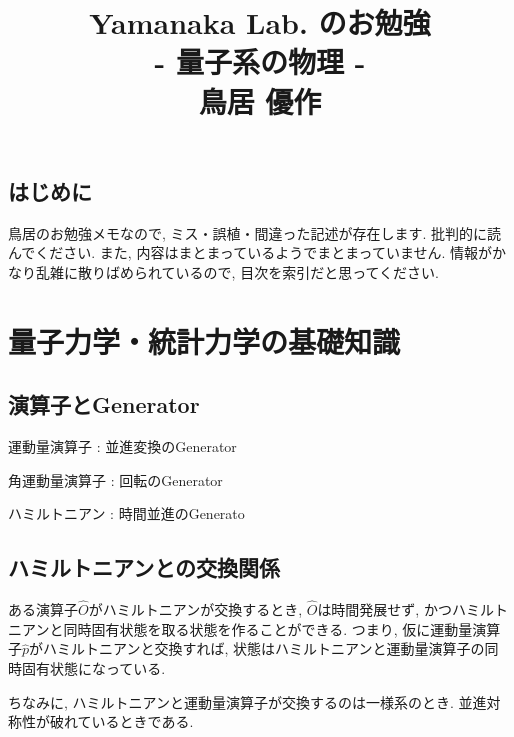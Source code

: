\documentclass[10.5pt,a4paper]{jreport}
\title{
  \Huge Yamanaka Lab. のお勉強\\
  \huge - 量子系の物理 -\\[1cm]
  \Large 鳥居 優作
}
\begin{document}
\maketitle
\thispagestyle{empty}
\tableofcontents
\section{はじめに}
鳥居のお勉強メモなので, ミス・誤植・間違った記述が存在します. 批判的に読んでください. また, 内容はまとまっているようでまとまっていません. 情報がかなり乱雑に散りばめられているので, 目次を索引だと思ってください. 
\chapter{量子力学・統計力学の基礎知識}
\section{演算子とGenerator}
運動量演算子 : 並進変換のGenerator

角運動量演算子 : 回転のGenerator

ハミルトニアン : 時間並進のGenerato
\section{ハミルトニアンとの交換関係}
ある演算子$\hat{O}$がハミルトニアンが交換するとき, $\hat{O}$は時間発展せず, かつハミルトニアンと同時固有状態を取る状態を作ることができる. つまり, 仮に運動量演算子$\hat{p}$がハミルトニアンと交換すれば, 状態はハミルトニアンと運動量演算子の同時固有状態になっている.

ちなみに, ハミルトニアンと運動量演算子が交換するのは一様系のとき. 並進対称性が破れているときである. 
\end{document}
